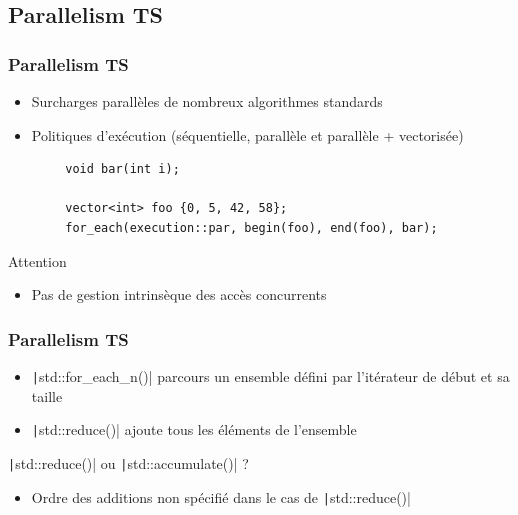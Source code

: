 \documentclass[C++.tex]{subfiles}
\begin{document}
\subsection*{Parallelism TS}
\begin{frame}[fragile]
	\frametitle{Parallelism TS}
	\begin{itemize}
		\item Surcharges parallèles de nombreux algorithmes standards
		\item Politiques d'exécution (séquentielle, parallèle et parallèle + vectorisée)
	\end{itemize}

	\begin{verbatim}
		void bar(int i);

		vector<int> foo {0, 5, 42, 58};
		for_each(execution::par, begin(foo), end(foo), bar);
	\end{verbatim}

	\begin{alertblock}{Attention}
		\begin{itemize}
			\item Pas de gestion intrinsèque des accès concurrents
		\end{itemize}
	\end{alertblock}
\end{frame}

\begin{frame}[fragile]
	\frametitle{Parallelism TS}
	\begin{itemize}
		\item \texttt|std::for_each_n()| parcours un ensemble défini par l'itérateur de début et sa taille


		\item \texttt|std::reduce()| \og ajoute\fg{} tous les éléments de l'ensemble
	\end{itemize}

	\begin{block}{\texttt|std::reduce()| ou \texttt|std::accumulate()| ?}
		\begin{itemize}
			\item Ordre des \og additions\fg{} non spécifié dans le cas de \texttt|std::reduce()|
		\end{itemize}

	\end{block}
\end{frame}
\end{document}
